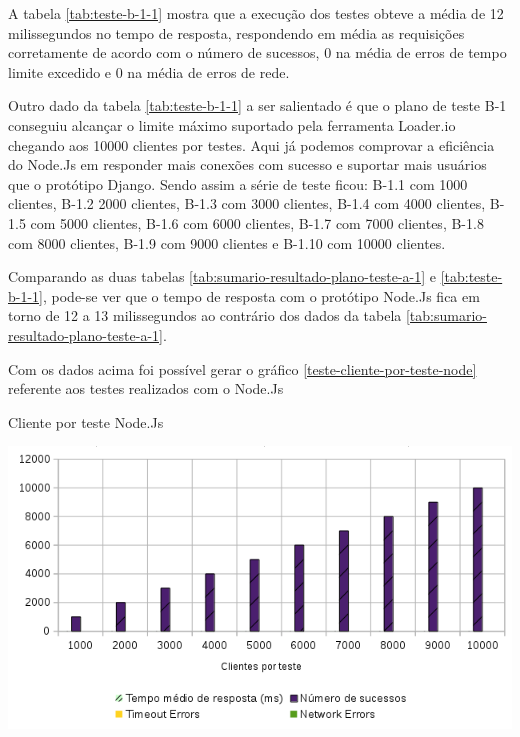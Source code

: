   A tabela \ref{tab:teste-b-1-1} mostra que a execução dos testes obteve a média de 12 milissegundos no tempo de resposta,
  respondendo em média as requisições corretamente de acordo com o número de sucessos, 0 na média de erros de tempo limite excedido
  e 0 na média de erros de rede.

  Outro dado da tabela \ref{tab:teste-b-1-1} a ser salientado é que o plano de teste B-1 conseguiu alcançar o limite máximo suportado pela ferramenta
  Loader.io chegando aos 10000 clientes por testes. Aqui já podemos comprovar a eficiência do Node.Js em responder mais conexões com sucesso e suportar
  mais usuários que o protótipo Django. Sendo assim a série de teste ficou: B-1.1 com 1000 clientes, B-1.2 2000 clientes,
  B-1.3 com 3000 clientes, B-1.4 com 4000 clientes, B-1.5 com 5000 clientes, B-1.6 com 6000 clientes, B-1.7 com 7000 clientes,
  B-1.8 com 8000 clientes, B-1.9 com 9000 clientes e B-1.10 com 10000 clientes.

  Comparando as duas tabelas \ref{tab:sumario-resultado-plano-teste-a-1} e \ref{tab:teste-b-1-1}, pode-se ver que
  o tempo de resposta com o protótipo Node.Js fica em torno de 12 a 13 milissegundos ao contrário dos dados da tabela \ref{tab:sumario-resultado-plano-teste-a-1}.

  Com os dados acima foi possível gerar o gráfico \ref{teste-cliente-por-teste-node} referente aos testes
  realizados com o Node.Js

  \begin{grafico}[H]
    \setlength{\abovecaptionskip}{5pt}
    \setlength{\belowcaptionskip}{0pt}
  
    \caption[Cliente por teste Node.Js]
	    {Cliente por teste Node.Js}
    \centering
    \includegraphics[width=.80\textwidth]{imagem/graficos/grafico_node_plano_de_teste_1.png}
    \captionsetup[grafico]{justification=centering}
    \label{teste-cliente-por-teste-node}
  \end{grafico}

